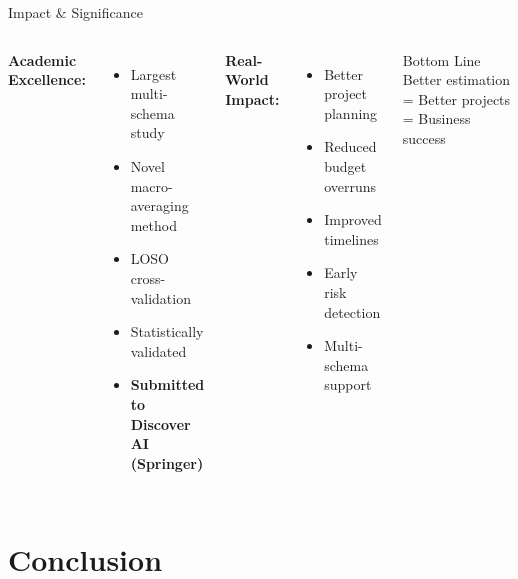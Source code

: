 \documentclass[aspectratio=169]{beamer}
\begin{document}
\begin{frame}{Impact \& Significance}
\begin{columns}[T]
\textbf{Academic Excellence:}
\begin{itemize}
    \item Largest multi-schema study
    \item Novel macro-averaging method
    \item LOSO cross-validation
    \item Statistically validated
    \item \textbf{Submitted to Discover AI (Springer)}
\end{itemize}

\textbf{Real-World Impact:}
\begin{itemize}
    \item Better project planning
    \item Reduced budget overruns
    \item Improved timelines
    \item Early risk detection
    \item Multi-schema support
\end{itemize}

\vspace{0.5cm}
\begin{exampleblock}{Bottom Line}
Better estimation = Better projects = Business success
\end{exampleblock}
\end{columns}
\end{frame}

\section{Conclusion}
\end{document}
